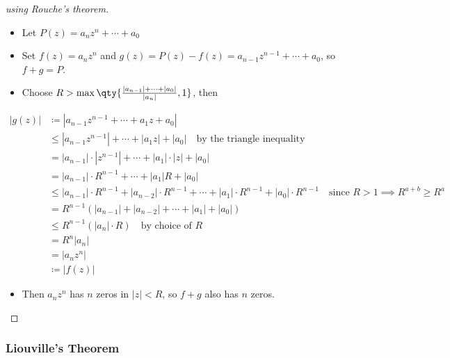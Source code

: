 \begin{proof}[using Rouche's theorem]

\envlist

\begin{itemize}
\tightlist
\item
  Let \(P(z) = a_nz^n + \cdots + a_0\)
\item
  Set \(f(z) = a_n z^n\) and
  \(g(z) = P(z) - f(z) = a_{n-1}z^{n-1} + \cdots + a_0\), so
  \(f+g = P\).
\item
  Choose
  \(R > \max\qty{ { {\left\lvert {a_{n-1}} \right\rvert} + \cdots + {\left\lvert {a_0} \right\rvert} \over {\left\lvert {a_n} \right\rvert} }, 1}\),
  then
\end{itemize}

\begin{align*} |g(z)|  &\coloneqq|a_{n-1}z^{n-1} + \cdots + a_1 z + a_0 | \\ &\leq |a_{n-1}z^{n-1}| + \cdots + |a_1 z| + |a_0 | \quad\text{by the triangle inequality} \\ &= |a_{n-1}|\cdot |z^{n-1}| + \cdots + |a_1|\cdot| z| + |a_0 | \\ &=  |a_{n-1}|\cdot R^{n-1} + \cdots + |a_1| R + |a_0 | \\ &\leq |a_{n-1}|\cdot R^{n-1}+|a_{n-2}|\cdot R^{n-1} + \cdots + |a_1| \cdot R^{n-1} + |a_0 |\cdot R^{n-1} \quad\text{since } R>1 \implies R^{a+b} \geq R^a \\ &= R^{n-1} \left( |a_{n-1}| + |a_{n-2}| + \cdots + |a_1| + |a_0| \right) \\ &\leq R^{n-1} \left( |a_n|\cdot R \right) \quad\text{by choice of } R   \\ &= R^{n} |a_n| \\ &= |a_n z^n| \\ &\coloneqq|f(z)| \end{align*}

\begin{itemize}
\tightlist
\item
  Then \(a_n z^n\) has \(n\) zeros in
  \({\left\lvert {z} \right\rvert} < R\), so \(f+g\) also has \(n\)
  zeros.
\end{itemize}

\end{proof}

\hypertarget{liouvilles-theorem}{%
\subsubsection{Liouville's Theorem}\label{liouvilles-theorem}}

